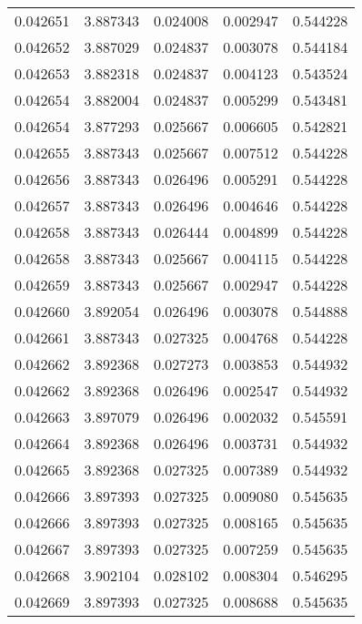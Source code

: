 \begin{tabular}{lrrrr}
0.042651    &  3.887343 &  0.024008 &  0.002947 &             0.544228 \\
0.042652    &  3.887029 &  0.024837 &  0.003078 &             0.544184 \\
0.042653    &  3.882318 &  0.024837 &  0.004123 &             0.543524 \\
0.042654    &  3.882004 &  0.024837 &  0.005299 &             0.543481 \\
0.042654    &  3.877293 &  0.025667 &  0.006605 &             0.542821 \\
0.042655    &  3.887343 &  0.025667 &  0.007512 &             0.544228 \\
0.042656    &  3.887343 &  0.026496 &  0.005291 &             0.544228 \\
0.042657    &  3.887343 &  0.026496 &  0.004646 &             0.544228 \\
0.042658    &  3.887343 &  0.026444 &  0.004899 &             0.544228 \\
0.042658    &  3.887343 &  0.025667 &  0.004115 &             0.544228 \\
0.042659    &  3.887343 &  0.025667 &  0.002947 &             0.544228 \\
0.042660    &  3.892054 &  0.026496 &  0.003078 &             0.544888 \\
0.042661    &  3.887343 &  0.027325 &  0.004768 &             0.544228 \\
0.042662    &  3.892368 &  0.027273 &  0.003853 &             0.544932 \\
0.042662    &  3.892368 &  0.026496 &  0.002547 &             0.544932 \\
0.042663    &  3.897079 &  0.026496 &  0.002032 &             0.545591 \\
0.042664    &  3.892368 &  0.026496 &  0.003731 &             0.544932 \\
0.042665    &  3.892368 &  0.027325 &  0.007389 &             0.544932 \\
0.042666    &  3.897393 &  0.027325 &  0.009080 &             0.545635 \\
0.042666    &  3.897393 &  0.027325 &  0.008165 &             0.545635 \\
0.042667    &  3.897393 &  0.027325 &  0.007259 &             0.545635 \\
0.042668    &  3.902104 &  0.028102 &  0.008304 &             0.546295 \\
0.042669    &  3.897393 &  0.027325 &  0.008688 &             0.545635 \\

\end{tabular}
